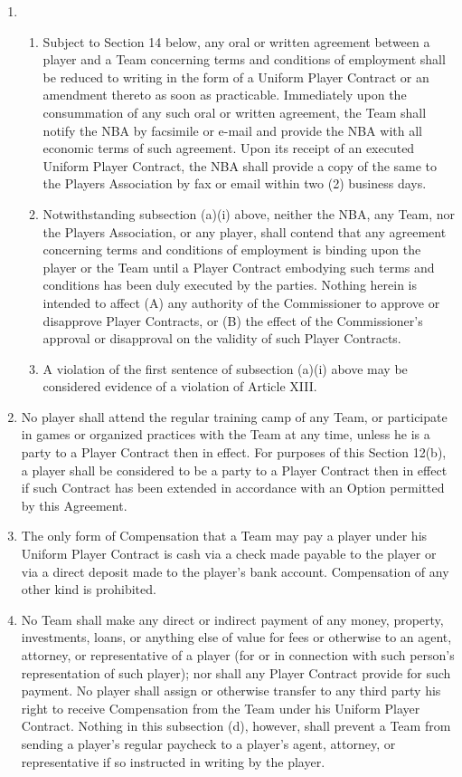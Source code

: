 \documentclass[
]{book}
\providecommand{\tightlist}{%
  \setlength{\itemsep}{0pt}\setlength{\parskip}{0pt}}
\begin{document}
\begin{enumerate}
\def\labelenumi{(\alph{enumi})}
\item
  \begin{enumerate}
  \def\labelenumii{(\roman{enumii})}
  \tightlist
  \item
    Subject to Section 14 below, any oral or written agreement between a player and a Team concerning terms and conditions of employment shall be reduced to writing in the form of a Uniform Player Contract or an amendment thereto as soon as practicable. Immediately upon the consummation of any such oral or written agreement, the Team shall notify the NBA by facsimile or e-mail and provide the NBA with all economic terms of such agreement. Upon its receipt of an executed Uniform Player Contract, the NBA shall provide a copy of the same to the Players Association by fax or email within two (2) business days.
  \item
    Notwithstanding subsection (a)(i) above, neither the NBA, any Team, nor the Players Association, or any player, shall contend that any agreement concerning terms and conditions of employment is binding upon the player or the Team until a Player Contract embodying such terms and conditions has been duly executed by the parties. Nothing herein is intended to affect (A) any authority of the Commissioner to approve or disapprove Player Contracts, or (B) the effect of the Commissioner's approval or disapproval on the validity of such Player Contracts.
  \item
    A violation of the first sentence of subsection (a)(i) above may be considered evidence of a violation of Article XIII.
  \end{enumerate}
\item
  No player shall attend the regular training camp of any Team, or participate in games or organized practices with the Team at any time, unless he is a party to a Player Contract then in effect. For purposes of this Section 12(b), a player shall be considered to be a party to a Player Contract then in effect if such Contract has been extended in accordance with an Option permitted by this Agreement.
\item
  The only form of Compensation that a Team may pay a player under his Uniform Player Contract is cash via a check made payable to the player or via a direct deposit made to the player's bank account. Compensation of any other kind is prohibited.
\item
  No Team shall make any direct or indirect payment of any money, property, investments, loans, or anything else of value for fees or otherwise to an agent, attorney, or representative of a player (for or in connection with such person's representation of such player); nor shall any Player Contract provide for such payment. No player shall assign or otherwise transfer to any third party his right to receive Compensation from the Team under his Uniform Player Contract. Nothing in this subsection (d), however, shall prevent a Team from sending a player's regular paycheck to a player's agent, attorney, or representative if so instructed in writing by the player.

\end{enumerate}
\end{document}
